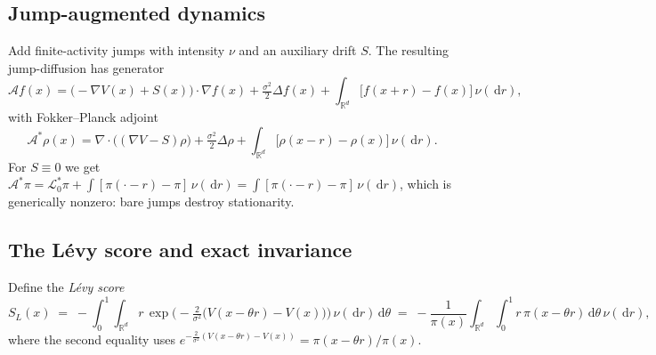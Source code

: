 \documentclass[11pt]{article}
\theoremstyle{plain}
\theoremstyle{remark}
\newcommand{\R}{\mathbb{R}}
\newcommand{\dd}{\,\mathrm{d}}
\begin{document}
\subsection{Jump-augmented dynamics}
Add finite-activity jumps with intensity $\nu$ and an auxiliary drift $S$. The
resulting jump-diffusion has generator
\begin{equation}\label{eq:gen}
\mathcal A f(x)=\big(-\nabla V(x)+S(x)\big)\!\cdot\!\nabla f(x)
+\tfrac{\sigma^2}{2}\Delta f(x)
+\int_{\R^d}\!\big[f(x+r)-f(x)\big]\,\nu(\dd r),
\end{equation}
with Fokker--Planck adjoint
\begin{equation}\label{eq:fp}
\mathcal A^{*}\rho(x)=\nabla\!\cdot\!\big((\nabla V-S)\rho\big)
+\tfrac{\sigma^2}{2}\Delta\rho
+\int_{\R^d}\!\big[\rho(x-r)-\rho(x)\big]\,\nu(\dd r).
\end{equation}
For $S\equiv 0$ we get $\mathcal A^{*}\pi=\mathcal L_0^{*}\pi+\int[\pi(\cdot-r)-\pi]\,\nu(\dd r)
=\int[\pi(\cdot-r)-\pi]\,\nu(\dd r)$, which is generically nonzero: bare jumps
destroy stationarity.

\subsection{The L\'evy score and exact invariance}
Define the \emph{L\'evy score}
\begin{equation}\label{eq:score}
S_L(x)\;=\;-\int_0^1\!\!\int_{\R^d} r\,
\exp\!\Big(-\tfrac{2}{\sigma^2}\big(V(x-\theta r)-V(x)\big)\Big)\,\nu(\dd r)\dd\theta
\;=\;-\frac{1}{\pi(x)}\int_{\R^d}\!\!\int_0^1 r\,\pi(x-\theta r)\dd\theta\,\nu(\dd r),
\end{equation}
where the second equality uses $e^{-\frac{2}{\sigma^2}(V(x-\theta r)-V(x))}=\pi(x-\theta r)/\pi(x)$.
\end{document}
